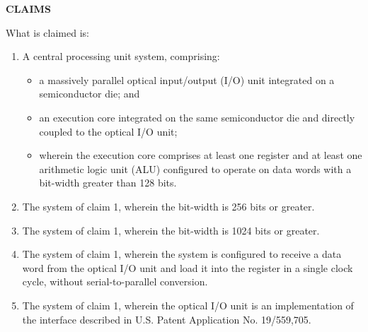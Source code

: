 \documentclass[11pt,letterpaper]{article}
\begin{document}
\thispagestyle{empty}

\begin{center}
    \textbf{\large CLAIMS}
\end{center}

\vspace{0.4cm}
\noindent What is claimed is:

\begin{enumerate}[label=\textbf{\arabic*.}, leftmargin=0.5in, itemsep=0.4cm]
    \item A central processing unit system, comprising:
    \begin{itemize}[leftmargin=0.3in, noitemsep]
        \item a massively parallel optical input/output (I/O) unit integrated on a semiconductor die; and
        \item an execution core integrated on the same semiconductor die and directly coupled to the optical I/O unit;
        \item wherein the execution core comprises at least one register and at least one arithmetic logic unit (ALU) configured to operate on data words with a bit-width greater than 128 bits.
    \end{itemize}

    \item The system of claim 1, wherein the bit-width is 256 bits or greater.

    \item The system of claim 1, wherein the bit-width is 1024 bits or greater.

    \item The system of claim 1, wherein the system is configured to receive a data word from the optical I/O unit and load it into the register in a single clock cycle, without serial-to-parallel conversion.

    \item The system of claim 1, wherein the optical I/O unit is an implementation of the interface described in U.S. Patent Application No. 19/559,705.
\end{enumerate}
\end{document}
